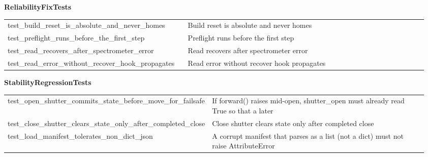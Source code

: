 \par\smallskip \textbf{ReliabilityFixTests} \par\nopagebreak\smallskip
\begin{longtable}{@{}>{\ttfamily\scriptsize\raggedright\arraybackslash}p{0.40\linewidth} >{\footnotesize\raggedright\arraybackslash}p{0.555\linewidth}@{}}
test\_\allowbreak{}build\_\allowbreak{}reset\_\allowbreak{}is\_\allowbreak{}absolute\_\allowbreak{}and\_\allowbreak{}never\_\allowbreak{}homes & Build reset is absolute and never homes \\
test\_\allowbreak{}preflight\_\allowbreak{}runs\_\allowbreak{}before\_\allowbreak{}the\_\allowbreak{}first\_\allowbreak{}step & Preflight runs before the first step \\
test\_\allowbreak{}read\_\allowbreak{}recovers\_\allowbreak{}after\_\allowbreak{}spectrometer\_\allowbreak{}error & Read recovers after spectrometer error \\
test\_\allowbreak{}read\_\allowbreak{}error\_\allowbreak{}without\_\allowbreak{}recover\_\allowbreak{}hook\_\allowbreak{}propagates & Read error without recover hook propagates \\
\end{longtable}
\par\smallskip \textbf{StabilityRegressionTests}\par\nopagebreak\smallskip
\begin{longtable}{@{}>{\ttfamily\scriptsize\raggedright\arraybackslash}p{0.40\linewidth} >{\footnotesize\raggedright\arraybackslash}p{0.555\linewidth}@{}}
test\_\allowbreak{}open\_\allowbreak{}shutter\_\allowbreak{}commits\_\allowbreak{}state\_\allowbreak{}before\_\allowbreak{}move\_\allowbreak{}for\_\allowbreak{}failsafe & If forward() raises mid-open, shutter\_open must already read True so that a later \\
test\_\allowbreak{}close\_\allowbreak{}shutter\_\allowbreak{}clears\_\allowbreak{}state\_\allowbreak{}only\_\allowbreak{}after\_\allowbreak{}completed\_\allowbreak{}close & Close shutter clears state only after completed close \\
test\_\allowbreak{}load\_\allowbreak{}manifest\_\allowbreak{}tolerates\_\allowbreak{}non\_\allowbreak{}dict\_\allowbreak{}json & A corrupt manifest that parses as a list (not a dict) must not raise AttributeError \\
\end{longtable}
